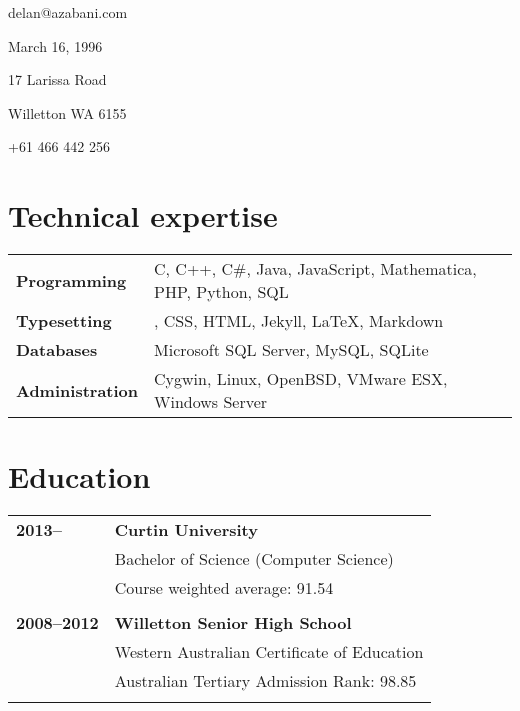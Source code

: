 \documentclass[a4paper,12pt]{article}
\begin{document}
\hrulefill

\hspace{1cm}\begin{minipage}{7cm}
	{\Huge delan\textcolor{lg}@azabani\textcolor{lg}{.com}}
\end{minipage}\hfill\begin{minipage}{4cm}
	\hfill	March 16, 1996		\par
	\hfill	17 Larissa Road		\par
	\hfill	Willetton WA 6155	\par
	\hfill	+61 466 442 256		\par
\end{minipage}\hspace{1cm}

\hrulefill

\section*{Technical expertise}

\begin{tabular}{p{3.5cm}p{12.5cm}}
	\textbf{Programming} &
		C, C++, C\#, Java, JavaScript, Mathematica, PHP, Python, SQL \\
	\textbf{Typesetting} &
		\BibTeX, CSS, HTML, Jekyll, \LaTeX, Markdown \\
	\textbf{Databases} &
		Microsoft SQL Server, MySQL, SQLite \\
	\textbf{Administration} &
		Cygwin, Linux, OpenBSD, VMware ESX, Windows Server
\end{tabular}

\section*{Education}

\begin{tabular}{p{3.5cm}p{12.5cm}}
	\textbf{2013--} &
		\textbf{Curtin University}\\
		& Bachelor of Science (Computer Science)\\
		& Course weighted average: 91.54\\\\
	\textbf{2008--2012} &
		\textbf{Willetton Senior High School}\\
		& Western Australian Certificate of Education\\
		& Australian Tertiary Admission Rank: 98.85\\\\
\end{tabular}
\end{document}
